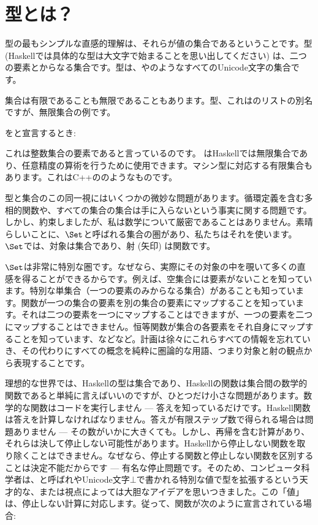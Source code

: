 \section{型とは？}

型の最もシンプルな直感的理解は、それらが値の集合であるということです。型 (Haskellでは具体的な型は大文字で始まることを思い出してください) は、二つの要素とからなる集合です。型は、やのようなすべてのUnicode文字の集合です。

集合は有限であることも無限であることもあります。型、これはのリストの別名ですが、無限集合の例です。

をと宣言するとき: 

これは整数集合の要素であると言っているのです。
はHaskellでは無限集合であり、任意精度の算術を行うために使用できます。マシン型に対応する有限集合もあります。これはC++ののようなものです。

型と集合のこの同一視にはいくつかの微妙な問題があります。循環定義を含む多相的関数や、すべての集合の集合は手に入らないという事実に関する問題です。しかし、約束しましたが、私は数学について厳密であることはありません。素晴らしいことに、$\Set$と呼ばれる集合の圏があり、私たちはそれを使います。$\Set$では、対象は集合であり、射 (矢印) は関数です。

$\Set$は非常に特別な圏です。なぜなら、実際にその対象の中を覗いて多くの直感を得ることができるからです。例えば、空集合には要素がないことを知っています。特別な単集合（一つの要素のみからなる集合）があることも知っています。関数が一つの集合の要素を別の集合の要素にマップすることを知っています。それは二つの要素を一つにマップすることはできますが、一つの要素を二つにマップすることはできません。恒等関数が集合の各要素をそれ自身にマップすることを知っています、などなど。計画は徐々にこれらすべての情報を忘れていき、その代わりにすべての概念を純粋に圏論的な用語、つまり対象と射の観点から表現することです。

理想的な世界では、Haskellの型は集合であり、Haskellの関数は集合間の数学的関数であると単純に言えばいいのですが、ひとつだけ小さな問題があります。数学的な関数はコードを実行しません --- 答えを知っているだけです。Haskell関数は答えを計算しなければなりません。答えが有限ステップ数で得られる場合は問題ありません --- その数がいかに大きくても。しかし、再帰を含む計算があり、それらは決して停止しない可能性があります。Haskellから停止しない関数を取り除くことはできません。なぜなら、停止する関数と停止しない関数を区別することは決定不能だからです --- 有名な停止問題です。そのため、コンピュータ科学者は、と呼ばれ\code{\_|\_}やUnicode文字$\bot$で書かれる特別な値で型を拡張するという天才的な、または視点によっては大胆なアイデアを思いつきました。この「値」は、停止しない計算に対応します。従って、関数が次のように宣言されている場合: 

